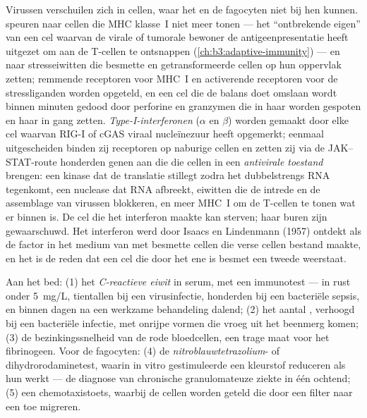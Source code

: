 \begin{definition}\label{def:b3:innate-immunity:nk-ifn}
Virussen verschuilen zich in cellen, waar het  en de fagocyten
niet bij hen kunnen. \emph{} speuren naar cellen
die MHC klasse~I niet meer tonen --- het ``ontbrekende eigen'' van een
cel waarvan de virale of tumorale bewoner de antigeenpresentatie heeft
uitgezet om aan de T-cellen te ontsnappen
(\cref{ch:b3:adaptive-immunity}) --- en naar stresseiwitten die besmette
en getransformeerde cellen op hun oppervlak zetten; remmende receptoren
voor MHC~I en activerende receptoren voor de stressliganden worden
opgeteld, en een cel die de balans doet omslaan wordt binnen minuten
gedood door perforine en granzymen die in haar worden gespoten en haar
 in gang zetten. \emph{Type-I-interferonen} ($\alpha$ en
$\beta$) worden gemaakt door elke cel waarvan RIG-I of cGAS viraal
nucleïnezuur heeft opgemerkt; eenmaal uitgescheiden binden zij
receptoren op naburige cellen en zetten zij via de JAK--STAT-route
honderden genen aan die die cellen in een \emph{antivirale toestand}
brengen: een kinase dat de translatie stillegt zodra het dubbelstrengs
RNA tegenkomt, een nuclease dat RNA afbreekt, eiwitten die de intrede en
de assemblage van virussen blokkeren, en meer MHC~I om de T-cellen te
tonen wat er binnen is. De cel die het interferon maakte kan sterven;
haar buren zijn gewaarschuwd. Het interferon werd door Isaacs en
Lindenmann (1957) ontdekt als de factor in het medium van met 
besmette cellen die verse cellen bestand maakte, en het is de reden dat
een cel die door het ene  is besmet een tweede weerstaat.
\end{definition}

\begin{method}\label{met:b3:innate-immunity:tests}
Aan het bed: (1) het \emph{C-reactieve eiwit} in serum, met een
immunotest --- in rust onder \qty{5}{mg/L}, tientallen bij een
virusinfectie, honderden bij een bacteriële sepsis, en binnen dagen na
een werkzame behandeling dalend; (2) het aantal , verhoogd
bij een bacteriële infectie, met onrijpe vormen die vroeg uit het
beenmerg komen; (3) de bezinkingssnelheid van de rode bloedcellen, een
trage maat voor het fibrinogeen. Voor de fagocyten: (4) de
\emph{nitroblauwtetrazolium}- of dihydrorodaminetest, waarin in vitro
gestimuleerde  een kleurstof reduceren als hun
 werkt --- de diagnose van chronische granulomateuze
ziekte in één ochtend; (5) een chemotaxistoets, waarbij de cellen
worden geteld die door een filter naar een  toe migreren.
\end{method}

